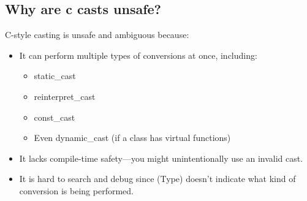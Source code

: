 \documentclass{report}
\begin{document}
    \subsection{Why are c casts unsafe?}
    \bigbreak \noindent 
    C-style casting is unsafe and ambiguous because:
    \begin{itemize}
        \item It can perform multiple types of conversions at once, including:
            \begin{itemize}
                \item static\_cast
                \item reinterpret\_cast
                \item const\_cast
                \item Even dynamic\_cast (if a class has virtual functions)
            \end{itemize}
        \item It lacks compile-time safety—you might unintentionally use an invalid cast.
        \item It is hard to search and debug since (Type) doesn’t indicate what kind of conversion is being performed.
    \end{itemize}
\end{document}

